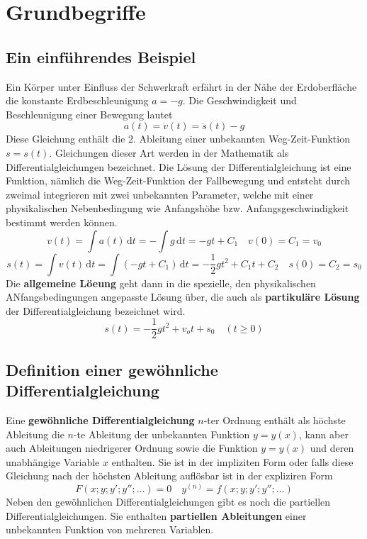 \section{Grundbegriffe}
\subsection{Ein einführendes Beispiel}
Ein Körper unter Einfluss der Schwerkraft erfährt in der Nähe der Erdoberfläche die konstante Erdbeschleunigung $a=-g$. Die Geschwindigkeit und Beschleunigung einer Bewegung lautet
\begin{equation}
\boxed{a\left(t\right)=\dot{v}\left(t\right)=\ddot{s}\left(t\right)-g}
\end{equation}
Diese Gleichung enthält die 2. Ableitung einer unbekannten Weg-Zeit-Funktion $s=s\left(t\right)$. Gleichungen dieser Art werden in der Mathematik als Differentialgleichungen bezeichnet. Die Lösung der Differentialgleichung ist eine Funktion, nämlich die Weg-Zeit-Funktion der Fallbewegung und entsteht durch zweimal integrieren mit zwei unbekannten Parameter, welche mit einer physikalischen Nebenbedingung wie Anfangshöhe bzw. Anfangsgeschwindigkeit bestimmt werden können.
\begin{equation}
\boxed{v\left(t\right)=\displaystyle \int a\left(t\right)\,\text{d}t=-\displaystyle \int g\,\text{d}t=-gt+C_1}\quad \boxed{v\left(0\right)=C_1=v_0}
\end{equation}
\begin{equation}
\boxed{s\left(t\right)=\displaystyle \int v\left(t\right)\,\text{d}t=\displaystyle \int \left(-gt+C_1\right)\,\text{d}t=-\dfrac{1}{2}gt^2+C_1t+C_2}\quad \boxed{s\left(0\right)=C_2=s_0}
\end{equation}
Die \textbf{allgemeine Löeung} geht dann in die spezielle, den physikalischen ANfangsbedingungen angepasste Lösung über, die auch als \textbf{partikuläre Lösung} der Differentialgleichung bezeichnet wird.
\begin{equation}
\boxed{s\left(t\right)=-\dfrac{1}{2}gt^2+v_ot+s_0\quad \left(t\geq 0\right)}
\end{equation}
\subsection{Definition einer gewöhnliche Differentialgleichung}
Eine \textbf{gewöhnliche Differentialgleichung} $n$-ter Ordnung enthält als höchste Ableitung die $n$-te Ableitung der unbekannten Funktion $y=y\left(x\right)$, kann aber auch Ableitungen niedrigerer Ordnung sowie die Funktion $y=y\left(x\right)$ und deren unabhängige Variable $x$ enthalten. Sie ist in der impliziten Form oder falls diese Gleichung nach der höchsten Ableitung auflösbar ist in der expliziren Form
\begin{equation} 
\boxed{F\left(x; y; y'; y''; \dotso\right)=0}\quad \boxed{y^{\left(n\right)}=f\left(x; y; y'; y'';\dotso\right)}
\end{equation} 
Neben den gewöhnlichen Differentialgleichungen gibt es noch die partiellen Differentialgleichungen. Sie enthalten \textbf{partiellen Ableitungen} einer unbekannten Funktion von mehreren Variablen. 
